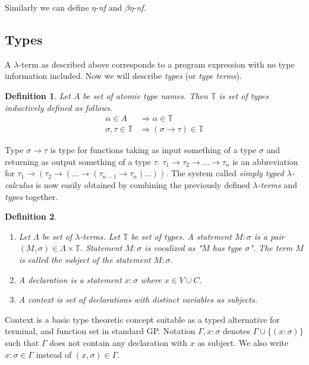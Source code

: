 \documentclass{sig-alternate}
\newtheorem{definition}{Definition}
\newcommand{\lterm}{$\lambda$-term\xspace}
\newcommand{\lterms}{$\lambda$-terms\xspace}
\newcommand{\then}{\Rightarrow\xspace}
\newcommand{\enf}{$\eta$-\textit{nf}\xspace}
\newcommand{\benf}{$\beta\eta$-\textit{nf}\xspace}
\newcommand{\ar}{\rightarrow\xspace}
\newcommand{\T}{\mathbb{T}\xspace}
\begin{document}
Similarly we can define \enf and \benf.

\subsection{Types}

A \lterm as described above
corresponds to a program expression with no type information
included. Now we will describe \textit{types} (or \textit{type terms}).

\begin{definition}
Let $A$ be set of {\it atomic type names}. 
Then $\mathbb{T}$ is set of {\it types} inductively defined as follows.
\begin{align*}
\alpha      \in A  &\then   \alpha \in \T \\
\sigma,\tau \in \T &\then ( \sigma \ar  \tau ) \in \T 
\end{align*}
\end{definition}


Type $\sigma \ar \tau$ is type for functions taking as input
something of a type $\sigma$ and returning 
as output something of a type $\tau$. 
$\tau_1 \ar \tau_2 \ar \dots \ar \tau_n$ is an abbreviation for 
$\tau_1 \ar (\tau_2 \ar (\dots \ar (\tau_{n-1} \ar \tau_n)\dots))$.
The system called \textit{simply typed $\lambda$-calculus} is now easily obtained by
combining the previously defined \textit{\lterms} and \textit{types} together.

\begin{definition}~

\begin{enumerate}
 \item 	Let $\Lambda$ be set of {\it \lterms}. 
	Let $\mathbb{T}$ be set of {\it types}.       
	A {\it statement} $M : \sigma$ is a pair 
	$(M,\sigma) \in \Lambda \times \mathbb{T}$.
	Statement $M : \sigma$ is vocalized as 
	{\it "$M$ has type $\sigma$"}.
	The term $M$ is called the {\it subject} of the 
	statement $M : \sigma$.
 \item A \textit{declaration} is a statement 
 $x : \sigma$ where $x \in V \cup C$.
  
 \item A \textit{context} 
 is set of declarations with distinct variables as subjects.
\end{enumerate}
\end{definition}

Context is a basic type theoretic concept suitable as a typed alternative
for terminal, and function set in standard GP. 
Notation $\Gamma,x:\sigma $ denotes $ \Gamma\cup\{(x:\sigma)\}$ 
such that $\Gamma$ does not contain any declaration with $x$ as subject.
We also write $x:\sigma \in \Gamma$ instead of $(x,\sigma) \in \Gamma$.
\end{document}
